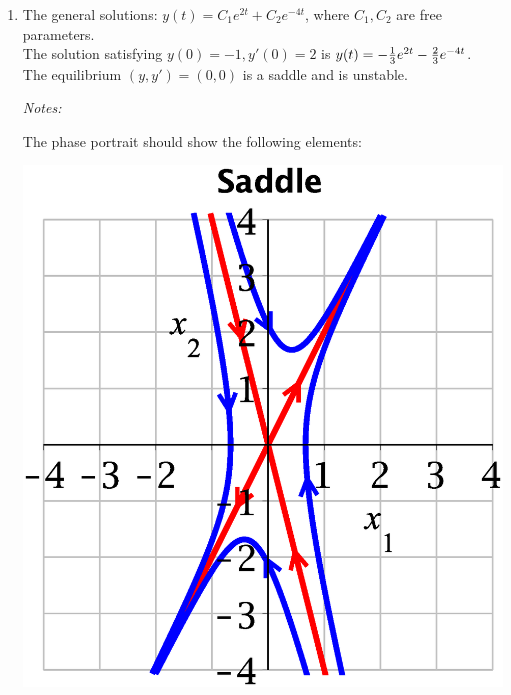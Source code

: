 \begin{enumerate}
	\item  
The general solutions: 
$\displaystyle y(t)=C_1 e^{2t} +C_2 e^{-4t}$, 
where $C_1,C_2$ are free parameters.\\[1ex]
The solution satisfying $y(0)=-1,y'(0)=2$ is 
$y(t)=-{1\over 3} e^{2t} -{2\over 3} e^{-4t}$.\\[1ex]
The equilibrium $(y,y')=(0,0)$ is a saddle
and is unstable.
\medskip

\begin{minipage}{0.65\textwidth}
{\color{red}\small\em Notes:}
	{\small \color{blue}
The phase portrait
should show the following elements:
}
\end{minipage}
\hfill
\begin{minipage}{0.3\textwidth}
\includegraphics*[width=\textwidth]{testpr-2nd-ord-eq-saddle.eps}
\end{minipage}
\medskip
  

\end{enumerate}
